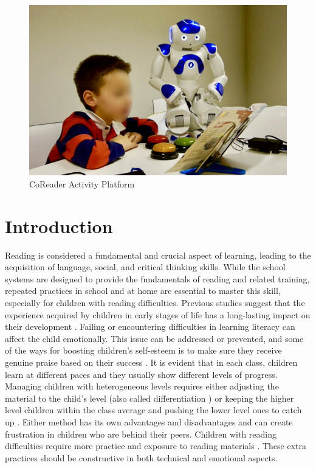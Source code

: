 \documentclass{sigchi}
\begin{document}
\begin{figure}[t]
  \centering
  \includegraphics[width=1\linewidth]{figures/Expsetup2.jpeg}
  \caption{CoReader Activity Platform}
  \label{fig:readingExp}
\end{figure}
% 
% 

\section{Introduction}
Reading is considered a fundamental and crucial aspect of learning, leading to the acquisition of language, social, and critical thinking skills.
While the school systems are designed to provide the fundamentals of reading and related training, repeated practices in school and at home are essential to master this skill, especially for children with reading difficulties. 
Previous studies suggest that the experience acquired by children in early stages of life has a long-lasting impact on their development \cite{feldman2008early}. 
Failing or encountering difficulties in learning literacy can affect the child emotionally. 
This issue can be addressed or prevented, and some of the ways for boosting children's self-esteem is to make sure they receive genuine praise based on their success \cite{valiente2012linking}.
It is evident that in each class, children learn at different paces and they usually show different levels of progress. 
Managing children with heterogeneous levels requires either adjusting the material to the child's level (also called differentiation \cite{van1996isomorphism}) or keeping the higher level children within the class average and pushing the lower level ones to catch up \cite{schmeck2013learning}.
Either method has its own advantages and disadvantages and can create frustration in children who are behind their peers. 
Children with reading difficulties require more practice and exposure to reading materials \cite{reid2016dyslexia}. 
These extra practices should be constructive in both technical and emotional aspects. 
\end{document}
